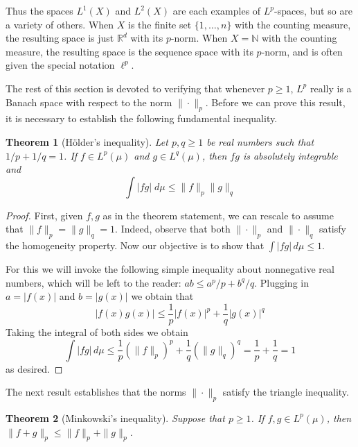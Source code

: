 \documentclass[11pt,oneside]{amsbook}
\newcommand{\NN}{{\mathbb N}}
\newcommand{\RR}{{\mathbb R}}
\theoremstyle{definition}
\theoremstyle{plain}
\newtheorem{thm}{Theorem}[section]
\theoremstyle{definition}
\theoremstyle{remark}
\numberwithin{equation}{section}
\numberwithin{figure}{section}
\begin{document}
Thus the spaces $L^1(X)$ and $L^2(X)$ are each examples of $L^p$-spaces, but so are a variety of others. When $X$ is the finite set $\{1,\ldots,n\}$ with the counting measure, the resulting space is just $\RR^d$ with its $p$-norm. When $X=\NN$ with the counting measure, the resulting space is the sequence space with its $p$-norm, and is often given the special notation $\ell^p$.

The rest of this section is devoted to verifying that whenever $p\geq1$, $L^p$ really is a Banach space with respect to the norm $\|\cdot\|_p$. Before we can prove this result, it is necessary to establish the following fundamental inequality.

\begin{thm}[H\"older's inequality]
  Let $p,q\geq1$ be real numbers such that $1/p+1/q=1$. If $f\in L^p(\mu)$ and $g\in L^q(\mu)$, then $fg$ is absolutely integrable and
  \[\int|fg|\;d\mu\leq\|f\|_p\|g\|_q
  \]
\end{thm}

\begin{proof}
  First, given $f,g$ as in the theorem statement, we can rescale to assume that $\|f\|_p=\|g\|_q=1$. Indeed, observe that both $\|\cdot\|_p$ and $\|\cdot\|_q$ satisfy the homogeneity property. Now our objective is to show that $\int|fg|\,d\mu\leq1$.

  For this we will invoke the following simple inequality about nonnegative real numbers, which will be left to the reader: $ab\leq a^p/p+b^q/q$. Plugging in $a=|f(x)|$ and $b=|g(x)|$ we obtain that
  \[|f(x)g(x)|\leq\frac1p|f(x)|^p+\frac1q|g(x)|^q
  \]
  Taking the integral of both sides we obtain
  \[\int|fg|\,d\mu\leq\frac1p(\|f\|_p)^p+\frac1q(\|g\|_q)^q
    =\frac1p+\frac1q=1
  \]
  as desired.
\end{proof}

The next result establishes that the norms $\|\cdot\|_p$ satisfy the triangle inequality.

\begin{thm}[Minkowski's inequality]
  Suppose that $p\geq1$. If $f,g\in L^p(\mu)$, then $\|f+g\|_p\leq\|f\|_p+\|g\|_p$.
\end{thm}
\end{document}
